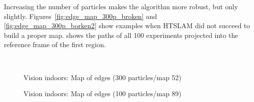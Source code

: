 Increasing the number of particles makes the algorithm more robust,
but only slightly. Figures~\ref{fig:edge_map_300p_broken} and
\ref{fig:edge_map_300p_borken2} show examples when HTSLAM did not
succeed to build a proper map.  shows the
paths of all 100 experiments projected into the reference frame of the
first region.


\begin{figure}[htbp]
  \centering

  \\

  \caption{Vision indoors: Map of edges (300 particles/map 52)}
  \label{fig:edge_map_300p}
\end{figure}

\begin{figure}[htbp]
  \centering
  \caption{Vision indoors: Map of edges (100 particles/map 89)}
  \label{fig:edge_map_100p}
\end{figure}

